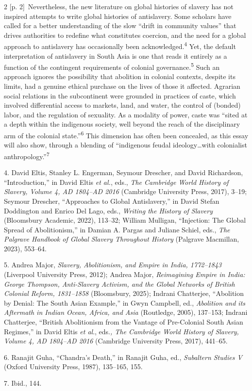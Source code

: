 \documentclass[10pt,a4paper]{article}
\begin{document}
\begin{paracol}{2}
\switchcolumn
{\scriptsize\color{gray} [p. 2]}\ Nevertheless, the new literature on global histories of slavery has not inspired attempts to write global histories of antislavery. Some scholars have called for a better understanding of the slow “drift in community values” that drives authorities to redefine what constitutes coercion, and the need for a global approach to antislavery has occasionally been acknowledged.\nobreak\textsuperscript{4} Yet, the default interpretation of antislavery in South Asia is one that reads it entirely as a function of the contingent requirements of colonial governance.\nobreak\textsuperscript{5} Such an approach ignores the possibility that abolition in colonial contexts, despite its limits, had a genuine ethical purchase on the lives of those it affected. Agrarian social relations in the subcontinent were grounded in practices of caste, which involved differential access to markets, land, and water, the control of (bonded) labor, and the regulation of sexuality. As a modality of power, caste was “sited at a depth within the indigenous society, well beyond the reach of the disciplinary arm of the colonial state.”\nobreak\textsuperscript{6} This dimension has often been concealed, as this essay will also show, through a blending of “indigenous feudal ideology…with colonialist anthropology.”\nobreak\textsuperscript{7}\par{\small 4. David Eltis, Stanley L. Engerman, Seymour Drescher, and David Richardson, “Introduction,” in David Eltis \textit{et al.}, eds., \textit{The Cambridge World History of Slavery, Volume 4, AD 1804–AD 2016} (Cambridge University Press, 2017), 3–19; Seymour Drescher, “Approaches to Global Antislavery,” in David Stefan Doddington and Enrico Del Lago, eds., \textit{Writing the History of Slavery} (Bloomsbury Academic, 2022), 113–32; William Mulligan, “Injection: The Global Spread of Abolitionism,” in Damian A. Pargas and Juliane Schiel, eds., \textit{The Palgrave Handbook of Global Slavery Throughout History} (Palgrave Macmillan, 2023), 553–64.\par}{\small 5. Andrea Major, \textit{Slavery, Abolitionism, and Empire in India, 1772–1843} (Liverpool University Press, 2012); Andrea Major, \textit{Reimagining Empire in India: George Thompson, Anti-Slavery Activism, and the Global Networks of British Colonial Reform, 1831–1858} (Bloomsbury, 2025); Indrani Chatterjee, “Abolition by Denial: The South Asian Example,” in Gwyn Campbell, ed., \textit{Abolition and its Aftermath in Indian Ocean, Africa, and Asia} (Routledge, 2005), 137–153; Indrani Chatterjee, “British Abolitionism from the Vantage of Pre-Colonial South Asian Regimes,” in David Eltis \textit{et al}., eds.\textit{, The Cambridge World History of Slavery, Volume 4, AD 1804–AD 2016} (Cambridge University Press, 2017), 441–65.\par}{\small 6. Ranajit Guha, “Chandra’s Death,” in Ranajit Guha, ed., \textit{Subaltern Studies V} (Oxford University Press, 1987), 135–165, 155.\par}{\small 7. Ibid., 144.\par}

\end{paracol}
\end{document}
